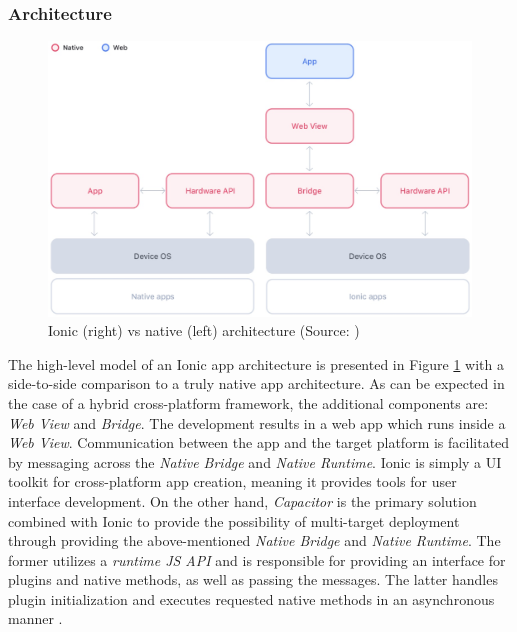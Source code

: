 \subsubsection*{Architecture}

\begin{figure}[h]
    \centering
    \includegraphics[width=\textwidth]{img/ionic_architecture}
    \caption{Ionic (right) vs native (left) architecture (Source: \cite{ionic_docs_architecture})}
    \label{fig:ionic_architecture}
\end{figure}

The high-level model of an Ionic app architecture is presented in Figure \ref{fig:ionic_architecture} with a side-to-side comparison to a truly native app architecture. As can be expected in the case of a hybrid cross-platform framework, the additional components are: \emph{Web View} and \emph{Bridge}. The development results in a web app which runs inside a \emph{Web View}. Communication between the app and the target platform is facilitated by messaging across the \emph{Native Bridge} and \emph{Native Runtime}. Ionic is simply a UI toolkit for cross-platform app creation, meaning it provides tools for user interface development. On the other hand, \emph{Capacitor} is the primary solution combined with Ionic to provide the possibility of multi-target deployment through providing the above-mentioned \emph{Native Bridge} and \emph{Native Runtime}.
The former utilizes a \emph{runtime JS API} and is responsible for providing an interface for plugins and native methods, as well as passing the messages. The latter handles plugin initialization and executes requested native methods in an asynchronous manner \cite{capacitor_how_works,ionic_docs_architecture,ionic_web_native}.

